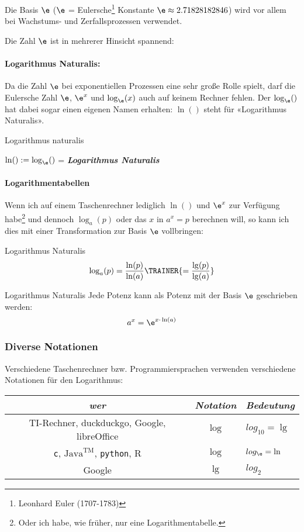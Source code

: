Die Basis $\e$ ($\e$ = Eulersche\footnote{Leonhard Euler (1707-1783)} Konstante $\e\approx 2.71828182846$) wird vor allem bei Wachstums- und Zerfallsprozessen verwendet.

Die Zahl $\e$ ist in mehrerer Hinsicht spannend:

\paragraph{Logarithmus Naturalis:} Da die
Zahl $\e$ bei exponentiellen Prozessen eine sehr große Rolle spielt,
darf die Eulersche Zahl $\e$, $\e^x$ und $\log_{\e}(x)$ auch auf keinem Rechner fehlen. Der $\log_{\e}()$ hat dabei sogar einen eigenen Namen erhalten:
$\ln()$ steht für «Logarithmus Naturalis».

\begin{definition}{Logarithmus naturalis}{}
  
  $\ln() := \log_{\e}()$ = \textit{\textbf{Logarithmus Naturalis}}
\end{definition}

\paragraph{Logarithmentabellen}
Wenn ich auf einem Taschenrechner lediglich $\ln()$ und $\e^x$ zur
Verfügung habe\footnote{Oder ich habe, wie früher, nur eine
Logarithmentabelle.} und dennoch $\log_a(p)$ oder das $x$ in $a^x=p$ berechnen will, so kann ich dies mit einer Transformation zur Basis $\e$ vollbringen:

\begin{gesetz}{Logarithmus Naturalis}{}
  $$\log_a(p) = \frac{\ln(p)}{\ln(a)} \TRAINER{= \frac{\lg(p)}{\lg(a)}}$$
\end{gesetz}

\begin{bemerkung}{Logarithmus Naturalis}{}
  Jede Potenz kann als Potenz mit der Basis $\e$ geschrieben werden:
  $$a^x = \e^{x\cdot{}\ln(a)}$$
\end{bemerkung}

\newpage
\subsubsection{Diverse Notationen}

Verschiedene Taschenrechner bzw. Programmiersprachen verwenden
verschiedene Notationen für den Logarithmus:

\begin{tabular}{|c|c|l|}\hline
 \textit{wer}        & \textit{\textbf{Notation}} & \textit{Bedeutung}\\\hline
  TI-Rechner, duckduckgo, Google, libreOffice & $\log$ & $log_{10} = \lg$\\\hline
  \texttt{c}, $\text{Java}^{\text{TM}}$, \texttt{python}, R   & $\log$ & $log_{\e} = \ln$\\\hline
  Google             & $\lg$  & $log_{2}$\\\hline
\end{tabular}

